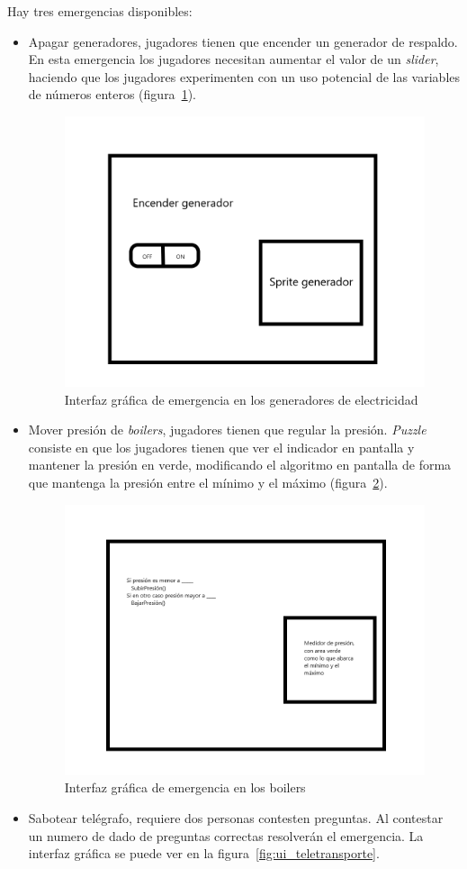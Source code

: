 Hay tres emergencias disponibles:
\begin{itemize}
    \item Apagar generadores, jugadores tienen que encender un generador de respaldo. En esta emergencia los jugadores necesitan aumentar el valor de un \textit{slider}, haciendo que los jugadores experimenten con un uso potencial de las variables de números enteros (figura~\ref{fig:ui_sab_generador}).
    \begin{figure}[H]
        \centering
        \includegraphics[width=0.5\linewidth]{images/SabotageGenerador.png}
        \caption{Interfaz gráfica de emergencia en los generadores de electricidad}
        \label{fig:ui_sab_generador}
    \end{figure}
    \item Mover presión de \textit{boilers}, jugadores tienen que regular la presión. \textit{Puzzle} consiste en que los jugadores tienen que ver el indicador en pantalla y mantener la presión en verde, modificando el algoritmo en pantalla de forma que mantenga la presión entre el mínimo y el máximo (figura~\ref{fig:ui_sab_presion}).
    \begin{figure}[H]
        \centering
        \includegraphics[width=0.5\linewidth]{images/SabotagePresion.png}
        \caption{Interfaz gráfica de emergencia en los boilers}
        \label{fig:ui_sab_presion}
    \end{figure}
    \item Sabotear telégrafo, requiere dos personas contesten preguntas. Al contestar un numero de dado de preguntas correctas resolverán el emergencia. La interfaz gráfica se puede ver en la figura~\ref{fig:ui_teletransporte}.

\end{itemize}
